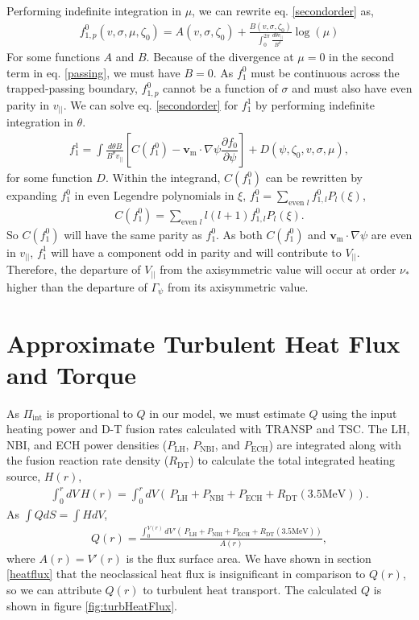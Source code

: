 \documentclass[aip, pop, preprint]{revtex4-1}
\numberwithin{figure}{section}
\numberwithin{equation}{section}
\newcommand{\partder}[2]{\dfrac{\partial  #1}{\partial  #2}} %
\begin{document}
Performing indefinite integration in $\mu$, we can rewrite eq. \ref{secondorder} as,
\begin{gather}
f_{1,p}^0(v, \sigma, \mu, \zeta_0) = A(v, \sigma, \zeta_0) + \frac{B(v, \sigma, \zeta_0)}{\int_0^{2\pi} \frac{d \theta v_{||}}{B^{\theta}}} \log(\mu)
\label{passing}
\end{gather}
For some functions $A$ and $B$. Because of the divergence at $\mu=0$ in the second term in eq. \ref{passing}, we must have $B = 0$. As $f_1^0$ must be continuous across the trapped-passing boundary, $f_{1,p}^0$ cannot be a function of $\sigma$ and must also have even parity in $v_{||}$. We can solve eq. \ref{secondorder} for $f_1^1$ by performing indefinite integration in $\theta$. 
\begin{gather}
f_{1}^1 = \int \frac{d \theta B}{B^{\theta} v_{||}} \left[C(f_1^0) - \bm{v}_{\text{m}} \cdot \nabla \psi \partder{f_0}{\psi} \right] + D(\psi, \zeta_0, v, \sigma, \mu),
\end{gather}
for some function $D$. Within the integrand, $C(f_1^0)$ can be rewritten by expanding $f_1^0$ in even Legendre polynomials in $\xi$, $f_1^0 = \sum_{\text{even }l} f_{1,l}^0 P_l(\xi)$,
\begin{gather}
C(f_1^0) = \sum_{\text{even }l} l(l+1) f_{1,l}^0 P_l(\xi).
\end{gather}
So $C(f_1^0)$ will have the same parity as $f_1^0$. As both $C(f_1^0)$ and $\bm{v}_{\text{m}} \cdot \nabla \psi$ are even in $v_{||}$, $f_1^1$ will have a component odd in parity and will contribute to $V_{||}$. Therefore, the departure of $V_{||}$ from the axisymmetric value will occur at order $\nu_*$ higher than the departure of $\Gamma_{\psi}$ from its axisymmetric value.

\section{Approximate Turbulent Heat Flux and Torque}\label{turbQ}

As $\Pi_{\text{int}}$ is proportional to $Q$ in our model, we must estimate $Q$ using the input heating power and D-T fusion rates calculated with TRANSP and TSC. The LH, NBI, and ECH power densities ($P_{\text{LH}}$, $P_{\text{NBI}}$, and $P_{\text{ECH}}$) are integrated along with the fusion reaction rate density ($R_{\text{DT}}$) to calculate the total integrated heating source, $H(r)$,
\begin{gather}
\int_0^r dV \, H(r) = \int_0^r dV \left(\, P_{\text{LH}} + P_{\text{NBI}} + P_{\text{ECH}} + R_{\text{DT}} (3.5 \text{MeV}) \right).
\end{gather}
As $\int Q dS = \int H dV$, 
\begin{gather}
Q(r) = \frac{\int_0^{V(r)} dV' \left(\, P_{\text{LH}} + P_{\text{NBI}} + P_{\text{ECH}} + R_{\text{DT}} (3.5 \text{MeV}) \right)}{A(r)},
\end{gather}
where $A(r) = V'(r)$ is the flux surface area. We have shown in section \ref{heatflux} that the neoclassical heat flux is insignificant in comparison to $Q(r)$, so we can attribute $Q(r)$ to turbulent heat transport. The calculated $Q$ is shown in figure \ref{fig:turbHeatFlux}.
\end{document}
